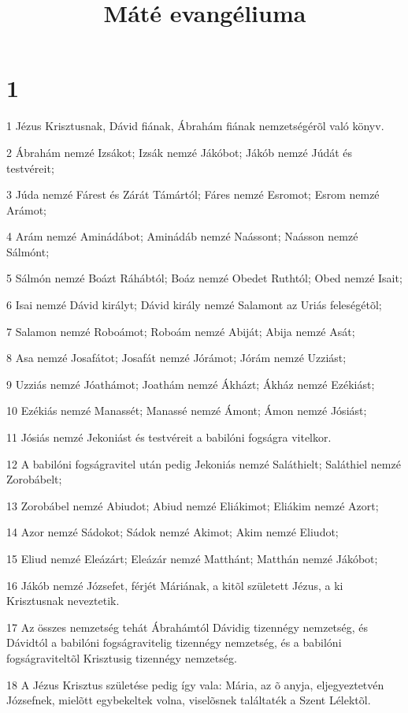 

\title{Máté evangéliuma}


\chapter{1}

\par 1 Jézus Krisztusnak, Dávid fiának, Ábrahám fiának nemzetségérõl való könyv.
\par 2 Ábrahám nemzé Izsákot; Izsák nemzé Jákóbot; Jákób nemzé Júdát és testvéreit;
\par 3 Júda nemzé Fárest és Zárát Támártól; Fáres nemzé Esromot; Esrom  nemzé Arámot;
\par 4 Arám nemzé Aminádábot; Aminádáb nemzé Naássont; Naásson nemzé Sálmónt;
\par 5 Sálmón nemzé Boázt Ráhábtól; Boáz nemzé Obedet Ruthtól; Obed nemzé Isait;
\par 6 Isai nemzé Dávid királyt; Dávid király nemzé Salamont az  Uriás feleségétõl;
\par 7 Salamon nemzé Roboámot; Roboám nemzé Abiját; Abija nemzé Asát;
\par 8 Asa nemzé Josafátot; Josafát nemzé Jórámot; Jórám nemzé Uzziást;
\par 9 Uzziás nemzé Jóathámot; Joathám nemzé Ákházt; Ákház  nemzé Ezékiást;
\par 10 Ezékiás nemzé Manassét; Manassé nemzé  Ámont; Ámon nemzé Jósiást;
\par 11 Jósiás nemzé Jekoniást és testvéreit a babilóni fogságra vitelkor.
\par 12 A babilóni fogságravitel után pedig Jekoniás nemzé Saláthielt; Saláthiel nemzé  Zorobábelt;
\par 13 Zorobábel nemzé Abiudot; Abiud nemzé Eliákimot; Eliákim nemzé Azort;
\par 14 Azor nemzé Sádokot; Sádok nemzé Akimot; Akim nemzé Eliudot;
\par 15 Eliud nemzé Eleázárt; Eleázár nemzé Matthánt; Matthán nemzé Jákóbot;
\par 16 Jákób nemzé Józsefet, férjét Máriának, a kitõl született Jézus, a ki Krisztusnak neveztetik.
\par 17 Az összes nemzetség tehát Ábrahámtól Dávidig tizennégy nemzetség, és Dávidtól a babilóni fogságravitelig tizennégy nemzetség, és a babilóni fogságraviteltõl Krisztusig tizennégy nemzetség.
\par 18 A Jézus Krisztus születése pedig így vala: Mária, az õ anyja, eljegyeztetvén Józsefnek, mielõtt egybekeltek volna, viselõsnek találtaték a Szent Lélektõl.
